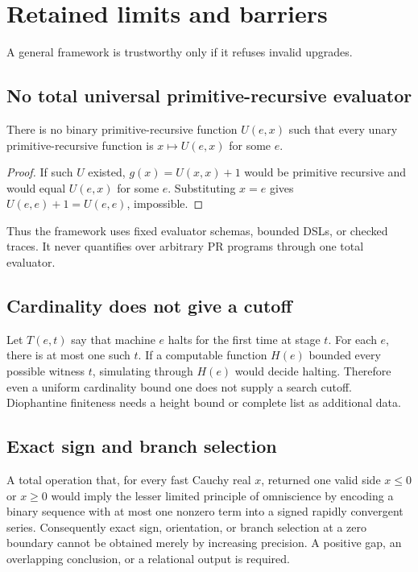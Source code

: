 \section{Retained limits and barriers}
\label{sec:barriers}

A general framework is trustworthy only if it refuses invalid upgrades.

\subsection{No total universal primitive-recursive evaluator}

\begin{theorem}
There is no binary primitive-recursive function \(U(e,x)\) such that every
unary primitive-recursive function is \(x\mapsto U(e,x)\) for some \(e\).
\end{theorem}

\begin{proof}
If such \(U\) existed, \(g(x)=U(x,x)+1\) would be primitive recursive and
would equal \(U(e,x)\) for some \(e\).  Substituting \(x=e\) gives
\(U(e,e)+1=U(e,e)\), impossible.
\end{proof}

Thus the framework uses fixed evaluator schemas, bounded DSLs, or checked
traces.  It never quantifies over arbitrary PR programs through one total
evaluator.

\subsection{Cardinality does not give a cutoff}

Let \(T(e,t)\) say that machine \(e\) halts for the first time at stage \(t\).
For each \(e\), there is at most one such \(t\).  If a computable function
\(H(e)\) bounded every possible witness \(t\), simulating through \(H(e)\)
would decide halting.  Therefore even a uniform cardinality bound one does not
supply a search cutoff.  Diophantine finiteness needs a height bound or complete
list as additional data.

\subsection{Exact sign and branch selection}

A total operation that, for every fast Cauchy real \(x\), returned one valid
side \(x\le0\) or \(x\ge0\) would imply the lesser limited principle of
omniscience by encoding a binary sequence with at most one nonzero term into a
signed rapidly convergent series.  Consequently exact sign, orientation, or
branch selection at a zero boundary cannot be obtained merely by increasing
precision.  A positive gap, an overlapping conclusion, or a relational output
is required.

